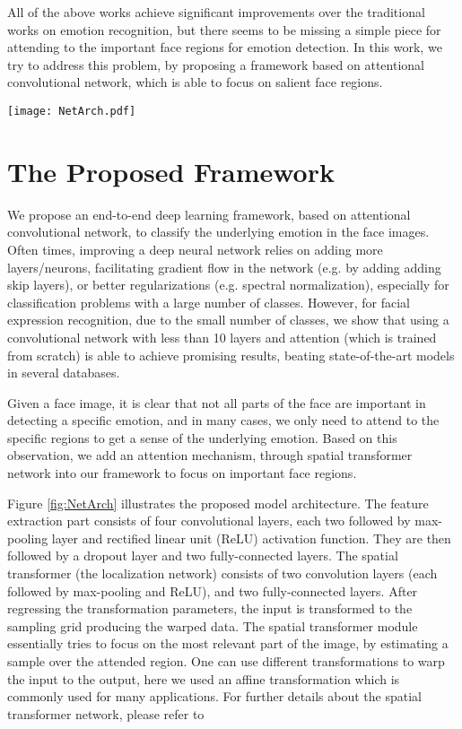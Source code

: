 \documentclass[conference]{IEEEtran}
\begin{document}
All of the above works achieve significant improvements over the traditional works on emotion recognition, but there seems to be missing a simple piece for attending to the important face regions for emotion detection. 
In this work, we try to address this problem, by proposing a framework based on attentional convolutional network, which is able to focus on salient face regions.




\begin{figure*}[t]
\begin{center}
   \texttt{[image: NetArch.pdf]}
\end{center}
   \caption{The proposed model architecture}
\label{fig:NetArch}
\end{figure*}




\section{The Proposed Framework}
We propose an end-to-end deep learning framework, based on attentional convolutional network, to classify the underlying emotion in the face images.
Often times, improving a deep neural network relies on adding more layers/neurons, facilitating gradient flow in the network (e.g. by adding adding skip layers), or better regularizations (e.g. spectral normalization), especially for classification problems with a large number of classes.
However, for facial expression recognition, due to the small number of classes, we show that using a convolutional network with less than 10 layers and attention (which is trained from scratch) is able to achieve promising results, beating state-of-the-art models in several databases.

Given a face image, it is clear that not all parts of the face are important in detecting a specific emotion, and in many cases, we only need to attend to the specific regions to get a sense of the underlying emotion.
Based on this observation, we add an attention mechanism, through spatial transformer network into our framework to focus on important face regions. 

Figure \ref{fig:NetArch} illustrates the proposed model architecture.
The feature extraction part consists of four convolutional layers, each two followed by max-pooling layer and rectified linear unit (ReLU) activation function. 
They are then followed by a dropout layer and two fully-connected layers.
The spatial transformer (the localization network) consists of two convolution layers (each followed by max-pooling and ReLU), and two fully-connected layers.
After regressing the transformation parameters, the input is transformed to the sampling grid  producing the warped data.
The spatial transformer module essentially tries to focus on the most relevant part of the image, by estimating a sample over the attended region. One can use different transformations to warp the input to the output, here we used an affine transformation which is commonly used for many applications.
For further details about the spatial transformer network, please refer to \cite{STN}
\end{document}

